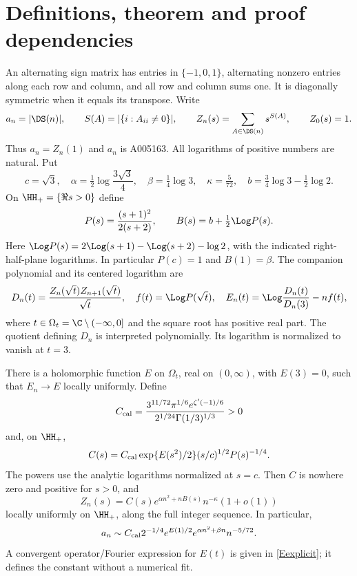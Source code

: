 \section{Definitions, theorem and proof dependencies}\label{sec:main}
An alternating sign matrix has entries in $\{-1,0,1\}$, alternating
nonzero entries along each row and column, and all row and column sums
one. It is diagonally symmetric when it equals its transpose. Write
\[
 a_n=|\DS(n)|,\qquad S(A)=|\{i:A_{ii}\ne0\}|,\qquad
 Z_n(s)=\sum_{A\in\DS(n)}s^{S(A)},\qquad Z_0(s)=1.
\]
Thus $a_n=Z_n(1)$ and $a_n$ is A005163. All logarithms of positive
numbers are natural. Put
\begin{equation}\label{constants}
 c=\sqrt3,\quad \alpha=\tfrac12\log\frac{3\sqrt3}{4},\quad
 \beta=\tfrac14\log3,\quad \kappa=\tfrac5{72},\quad
 b=\tfrac34\log3-\tfrac12\log2.
\end{equation}
On $\HH_+=\{\Re s>0\}$ define
\begin{equation}\label{pressure}
 P(s)=\frac{(s+1)^2}{2(s+2)},\qquad
 B(s)=b+\tfrac12\Log P(s).
\end{equation}
Here $\Log P(s)=2\Log(s+1)-\Log(s+2)-\log2$, with the indicated
right-half-plane logarithms. In particular $P(c)=1$ and $B(1)=\beta$.
The companion polynomial and its centered logarithm are
\begin{equation}\label{companiondefs}
 D_n(t)=\frac{Z_n(\sqrt t)Z_{n+1}(\sqrt t)}{\sqrt t},\quad
 f(t)=\Log P(\sqrt t),\quad
 E_n(t)=\Log\frac{D_n(t)}{D_n(3)}-nf(t),
\end{equation}
where $t\in\Omega_t=\C\setminus(-\infty,0]$ and the square root
has positive real part. The quotient defining $D_n$ is interpreted
polynomially. Its logarithm is normalized to vanish at $t=3$.

\begin{theorem}\label{thm:main}
There is a holomorphic function $E$ on $\Omega_t$, real on $(0,\infty)$,
with $E(3)=0$, such that $E_n\to E$ locally uniformly. Define
\begin{equation}\label{Ccal}
 C_{\rm cal}=
 \frac{3^{11/72}\pi^{1/6}e^{\zeta'(-1)/6}}
      {2^{1/24}\Gamma(1/3)^{1/3}}>0
\end{equation}
and, on $\HH_+$,
\begin{equation}\label{amplitude}
 C(s)=C_{\rm cal}\exp\{E(s^2)/2\}
       (s/c)^{1/2}P(s)^{-1/4}.
\end{equation}
The powers use the analytic logarithms normalized at $s=c$.
Then $C$ is nowhere zero and positive for $s>0$, and
\begin{equation}\label{fullequivalent}
 Z_n(s)=C(s)e^{\alpha n^2+nB(s)}n^{-\kappa}(1+o(1))
\end{equation}
locally uniformly on $\HH_+$, along the full integer sequence.
In particular,
\begin{equation}\label{aequiv}
 a_n\sim C_{\rm cal}2^{-1/4}e^{E(1)/2}
               e^{\alpha n^2+\beta n}n^{-5/72}.
\end{equation}
A convergent operator/Fourier expression for $E(t)$ is given in
\eqref{Eexplicit}; it defines the constant without a numerical fit.
\end{theorem}

